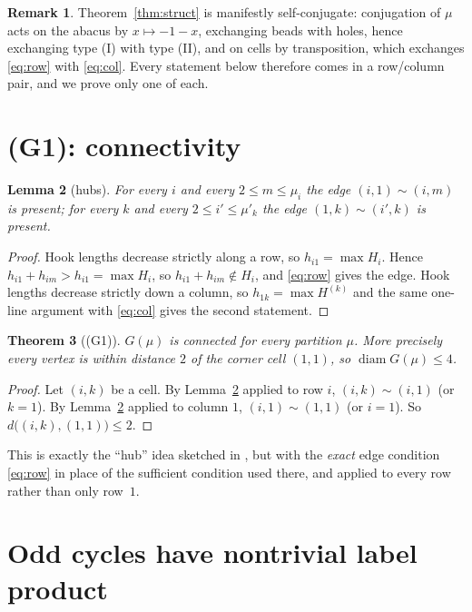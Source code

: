 \documentclass[11pt]{article}
\newtheorem{theorem}{Theorem}[section]
\newtheorem{lemma}[theorem]{Lemma}
\theoremstyle{definition}
\newtheorem{remark}[theorem]{Remark}
\begin{document}
\begin{remark}
Theorem~\ref{thm:struct} is manifestly self-conjugate: conjugation of $\mu$ acts on the abacus
by $x\mapsto -1-x$, exchanging beads with holes, hence exchanging type (I) with type (II), and
on cells by transposition, which exchanges \eqref{eq:row} with \eqref{eq:col}. Every statement
below therefore comes in a row/column pair, and we prove only one of each.
\end{remark}

\section{(G1): connectivity}

\begin{lemma}[hubs]\label{lem:hub}
For every $i$ and every $2\le m\le\mu_i$ the edge $(i,1)\sim(i,m)$ is present; for every $k$
and every $2\le i'\le\mu'_k$ the edge $(1,k)\sim(i',k)$ is present.
\end{lemma}

\begin{proof}
Hook lengths decrease strictly along a row, so $h_{i1}=\max H_i$. Hence
$h_{i1}+h_{im}>h_{i1}=\max H_i$, so $h_{i1}+h_{im}\notin H_i$, and \eqref{eq:row} gives the
edge. Hook lengths decrease strictly down a column, so $h_{1k}=\max H^{(k)}$ and the same
one-line argument with \eqref{eq:col} gives the second statement.
\end{proof}

\begin{theorem}[(G1)]\label{thm:G1}
$G(\mu)$ is connected for every partition $\mu$. More precisely every vertex is within
distance $2$ of the corner cell $(1,1)$, so $\operatorname{diam} G(\mu)\le4$.
\end{theorem}

\begin{proof}
Let $(i,k)$ be a cell. By Lemma~\ref{lem:hub} applied to row $i$, $(i,k)\sim(i,1)$ (or
$k=1$). By Lemma~\ref{lem:hub} applied to column $1$, $(i,1)\sim(1,1)$ (or $i=1$). So
$d\bigl((i,k),(1,1)\bigr)\le2$.
\end{proof}

\noindent This is exactly the ``hub'' idea sketched in \cite[\S7(2)]{Q140}, but with the
\emph{exact} edge condition \eqref{eq:row} in place of the sufficient condition used there,
and applied to every row rather than only row~$1$.

\section{Odd cycles have nontrivial label product}
\end{document}
